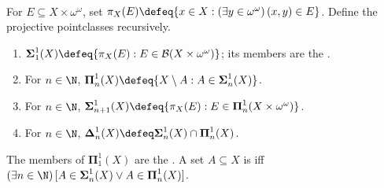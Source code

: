 \begin{definition} \label{def:projective-pointclasses} \\
For $E\subseteq X\times\omega^{\omega}$, set $\pi_X(E)\defeq\{x\in X:(\exists y\in\omega^{\omega})\,(x,y)\in E\}$. Define the projective pointclasses recursively.
\begin{enumerate}[label=(\roman*)]
\setlength{\itemsep}{0pt}
\item $\boldsymbol{\Sigma}^{1}_{1}(X)\defeq\{\pi_X(E):E\in\mathcal{B}(X\times\omega^{\omega})\}$; its members are the .
\item For $n\in\N$, $\boldsymbol{\Pi}^{1}_{n}(X)\defeq\{X\setminus A:A\in\boldsymbol{\Sigma}^{1}_{n}(X)\}$.
\item For $n\in\N$, $\boldsymbol{\Sigma}^{1}_{n+1}(X)\defeq\{\pi_X(E):E\in\boldsymbol{\Pi}^{1}_{n}(X\times\omega^{\omega})\}$.
\item For $n\in\N$, $\boldsymbol{\Delta}^{1}_{n}(X)\defeq\boldsymbol{\Sigma}^{1}_{n}(X)\cap\boldsymbol{\Pi}^{1}_{n}(X)$.
\end{enumerate}
The members of $\boldsymbol{\Pi}^{1}_{1}(X)$ are the . A set $A\subseteq X$ is  iff $(\exists n\in\N)\,[A\in\boldsymbol{\Sigma}^{1}_{n}(X)\lor A\in\boldsymbol{\Pi}^{1}_{n}(X)]$.
\end{definition}

